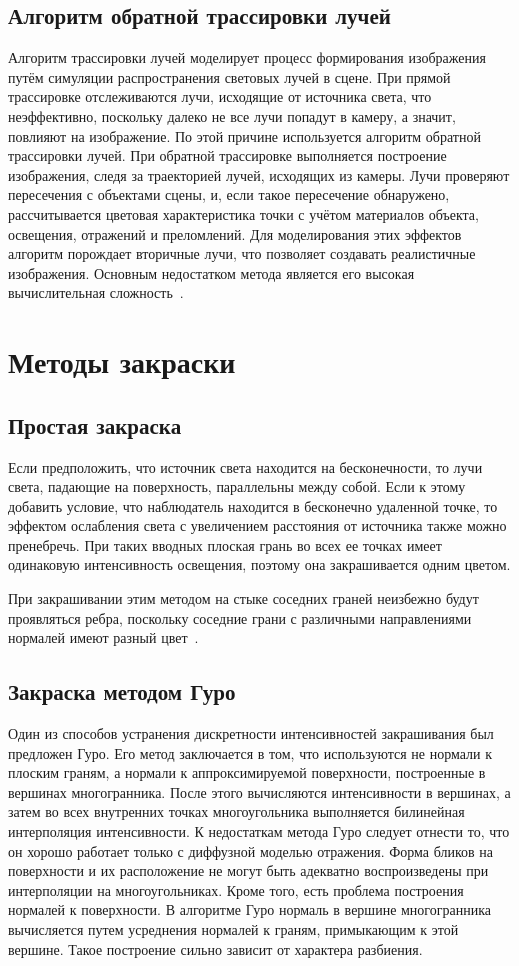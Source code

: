 \subsection{Алгоритм обратной трассировки лучей}
Алгоритм трассировки лучей моделирует процесс формирования изображения путём симуляции распространения световых лучей в сцене. При прямой трассировке отслеживаются лучи, исходящие от источника света, что неэффективно, поскольку далеко не все лучи попадут в камеру, а значит, повлияют на изображение. По этой причине используется алгоритм обратной трассировки лучей. При обратной трассировке выполняется построение изображения, следя за траекторией лучей, исходящих из камеры. Лучи проверяют пересечения с объектами сцены, и, если такое пересечение обнаружено, рассчитывается цветовая характеристика точки с учётом материалов объекта, освещения, отражений и преломлений. Для моделирования этих эффектов алгоритм порождает вторичные лучи, что позволяет создавать реалистичные изображения. Основным недостатком метода является его высокая вычислительная сложность~\cite{lit2, lit3}.

\section{Методы закраски}
\subsection{Простая закраска}
Если предположить, что источник света находится на бесконечности, то лучи света, падающие на поверхность, параллельны между собой. Если к этому добавить условие, что наблюдатель находится в бесконечно удаленной точке, то эффектом ослабления света с увеличением расстояния от источника также можно пренебречь. При таких вводных плоская грань во всех ее точках имеет одинаковую интенсивность освещения, поэтому она закрашивается одним цветом.

При закрашивании этим методом на стыке соседних граней неизбежно будут проявляться ребра, поскольку соседние грани с различными направлениями нормалей имеют разный цвет~\cite{lit5}.

\subsection{Закраска методом Гуро}
Один из способов устранения дискретности интенсивностей закрашивания был предложен Гуро. Его метод заключается в том, что используются не нормали к плоским граням, а нормали к аппроксимируемой поверхности, построенные в вершинах многогранника. После этого вычисляются интенсивности в вершинах, а затем во всех внутренних точках многоугольника выполняется билинейная интерполяция интенсивности.
К недостаткам метода Гуро следует отнести то, что он хорошо работает только с диффузной моделью отражения. Форма бликов на поверхности и их расположение не могут быть адекватно воспроизведены при интерполяции на многоугольниках. Кроме того, есть проблема построения нормалей к поверхности. В алгоритме Гуро нормаль в вершине многогранника вычисляется путем усреднения нормалей к граням, примыкающим к этой вершине. Такое построение сильно зависит от характера разбиения. 

